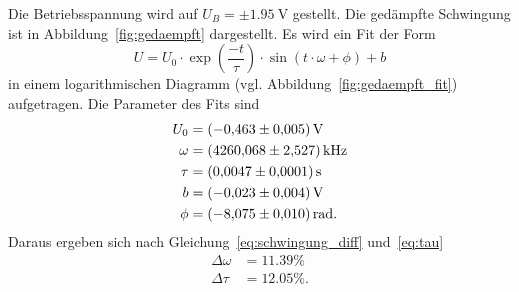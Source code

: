 Die Betriebsspannung wird auf $U_B = \pm \SI{1.95}{\volt}$ gestellt.
Die gedämpfte Schwingung ist in Abbildung~\ref{fig:gedaempft} dargestellt.
Es wird ein Fit der Form
\begin{equation}
U = U_0 \cdot \exp{\left(\frac{-t}{\tau}\right)} \cdot \sin{\left(t \cdot \omega  + \phi\right)} + b
\end{equation}
in einem logarithmischen Diagramm (vgl. Abbildung~\ref{fig:gedaempft_fit}) aufgetragen.
Die Parameter des Fits sind
\begin{align*}
  U_0 &= \SI{-0.463 \pm 0.005}{\volt} \\
  \omega &= \SI{4260.068 \pm 2.527}{\kilo\hertz} \\
  \tau &= \SI{0.0047 \pm 0.0001}{\second} \\
  b &= \SI{-0.023 \pm 0.004}{\volt} \\
  \phi &= \SI{-8.075 \pm 0.01}{\radian}.
\end{align*}
Daraus ergeben sich nach Gleichung~\eqref{eq:schwingung_diff} und~\eqref{eq:tau}
\begin{align*}
  \Delta \omega &= \num{11.39}\% \\
    \Delta \tau &= \num{12.05}\%.
\end{align*}
